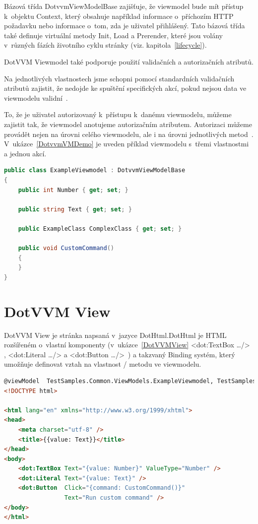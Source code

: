 Bázová třída DotvvmViewModelBase zajišťuje, že viewmodel bude mít přístup k~objektu Context, který obsahuje například informace o~příchozím HTTP požadavku nebo informace o~tom, zda je uživatel přihlášený.
Tato bázová třída také definuje virtuální metody Init, Load a Prerender, které jsou volány v~různých fázích životního cyklu stránky (viz. kapitola~\ref{lifecycle}).

DotVVM Viewmodel také podporuje použití validačních a autorizačních atributů.

Na jednotlivých vlastnostech jsme schopni pomocí standardních validačních atributů zajistit, že nedojde ke spuštění specifických akcí, pokud nejsou data ve viewmodelu validní~\cite{DotVVM-Validation}. 

To, že je uživatel autorizovaný k~přístupu k~danému viewmodelu, můžeme zajistit tak, že viewmodel anotujeme autorizačním atributem. Autorizaci můžeme provádět nejen na úrovni celého viewmodelu, ale i na úrovni jednotlivých metod~\cite{DotvvmAuth}. V~ukázce~\ref{DotvvmVMDemo} je uveden příklad viewmodelu s~třemi vlastnostmi a jednou akcí.

\begin{lstlisting}[language=c#, caption=Ukázka DotVVM Viewmodelu,label=DotvvmVMDemo,captionpos=t]
public class ExampleViewmodel : DotvvmViewModelBase
{
    public int Number { get; set; }

    public string Text { get; set; }

    public ExampleClass ComplexClass { get; set; }

    public void CustomCommand() 
    {
    }
}
\end{lstlisting}


\section{DotVVM View}
DotVVM View je stránka napsaná v~jazyce DotHtml.DotHtml je HTML rozšířeném o~vlastní komponenty (v~ukázce~\ref{DotVVMView} <dot:TextBox \ldots /> , <dot:Literal \ldots /> a <dot:Button \ldots />~) a takzvaný Binding systém, který umožňuje definovat vztah na vlastnost / metodu ve viewmodelu.

\begin{lstlisting}[language=html, caption=Ukázka DotHtml,captionpos=t,label=DotVVMView]
@viewModel  TestSamples.Common.ViewModels.ExampleViewmodel, TestSamples.Common
<!DOCTYPE html>

<html lang="en" xmlns="http://www.w3.org/1999/xhtml">
<head>
    <meta charset="utf-8" />
    <title>{{value: Text}}</title>
</head>
<body>
    <dot:TextBox Text="{value: Number}" ValueType="Number" />
    <dot:Literal Text="{value: Text}" />
    <dot:Button  Click="{command: CustomCommand()}"
                 Text="Run custom command" />
</body>
</html>
\end{lstlisting}

